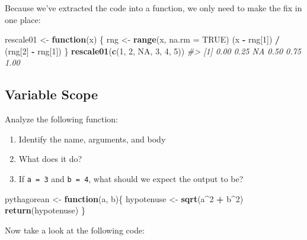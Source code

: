 \documentclass[]{book}
\newenvironment{Shaded}{\begin{snugshade}}{\end{snugshade}}
\newcommand{\CommentTok}[1]{\textcolor[rgb]{0.56,0.35,0.01}{\textit{#1}}}
\newcommand{\ControlFlowTok}[1]{\textcolor[rgb]{0.13,0.29,0.53}{\textbf{#1}}}
\newcommand{\DataTypeTok}[1]{\textcolor[rgb]{0.13,0.29,0.53}{#1}}
\newcommand{\DecValTok}[1]{\textcolor[rgb]{0.00,0.00,0.81}{#1}}
\newcommand{\KeywordTok}[1]{\textcolor[rgb]{0.13,0.29,0.53}{\textbf{#1}}}
\newcommand{\NormalTok}[1]{#1}
\newcommand{\OperatorTok}[1]{\textcolor[rgb]{0.81,0.36,0.00}{\textbf{#1}}}
\newcommand{\OtherTok}[1]{\textcolor[rgb]{0.56,0.35,0.01}{#1}}
\newcommand{\StringTok}[1]{\textcolor[rgb]{0.31,0.60,0.02}{#1}}
\providecommand{\tightlist}{%
  \setlength{\itemsep}{0pt}\setlength{\parskip}{0pt}}
\begin{document}
Because we've extracted the code into a function, we only need to make the fix in one place:

\begin{Shaded}
\begin{Highlighting}[]
\NormalTok{rescale01 <-}\StringTok{ }\ControlFlowTok{function}\NormalTok{(x) \{}
\NormalTok{  rng <-}\StringTok{ }\KeywordTok{range}\NormalTok{(x, }\DataTypeTok{na.rm =} \OtherTok{TRUE}\NormalTok{)}
\NormalTok{  (x }\OperatorTok{-}\StringTok{ }\NormalTok{rng[}\DecValTok{1}\NormalTok{]) }\OperatorTok{/}\StringTok{ }\NormalTok{(rng[}\DecValTok{2}\NormalTok{] }\OperatorTok{-}\StringTok{ }\NormalTok{rng[}\DecValTok{1}\NormalTok{])}
\NormalTok{\}}
\KeywordTok{rescale01}\NormalTok{(}\KeywordTok{c}\NormalTok{(}\DecValTok{1}\NormalTok{, }\DecValTok{2}\NormalTok{, }\OtherTok{NA}\NormalTok{, }\DecValTok{3}\NormalTok{, }\DecValTok{4}\NormalTok{, }\DecValTok{5}\NormalTok{))}
\CommentTok{#> [1] 0.00 0.25   NA 0.50 0.75 1.00}
\end{Highlighting}
\end{Shaded}

\hypertarget{variable-scope}{%
\subsection{Variable Scope}\label{variable-scope}}

Analyze the following function:

\begin{enumerate}
\def\labelenumi{\arabic{enumi}.}
\tightlist
\item
  Identify the name, arguments, and body
\item
  What does it do?
\item
  If \texttt{a\ =\ 3} and \texttt{b\ =\ 4}, what should we expect the output to be?
\end{enumerate}

\begin{Shaded}
\begin{Highlighting}[]
\NormalTok{pythagorean <-}\StringTok{ }\ControlFlowTok{function}\NormalTok{(a, b)\{}
\NormalTok{  hypotenuse <-}\StringTok{ }\KeywordTok{sqrt}\NormalTok{(a}\OperatorTok{^}\DecValTok{2} \OperatorTok{+}\StringTok{ }\NormalTok{b}\OperatorTok{^}\DecValTok{2}\NormalTok{)}
  \KeywordTok{return}\NormalTok{(hypotenuse)}
\NormalTok{\}}
\end{Highlighting}
\end{Shaded}

Now take a look at the following code:
\end{document}
